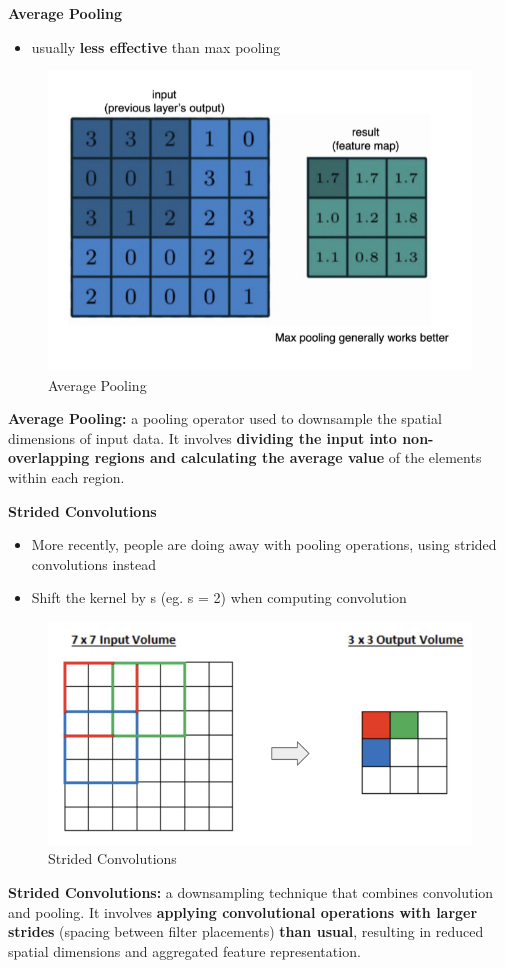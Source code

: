 \textbf{Average Pooling}
\begin{itemize}
    \item usually \textbf{less effective} than max pooling
\end{itemize}
\begin{figure}[h!t]
    \centering
    \includegraphics[width=0.4\linewidth]{averagepooling.png}
    \caption{Average Pooling}
    \label{fig:enter-label}
\end{figure}
\begin{definition}
    \textbf{Average Pooling:}  a pooling operator used to downsample the spatial dimensions of input data. It involves \textbf{dividing the input into non-overlapping regions and calculating the average value} of the elements within each region. 
\end{definition}

\textbf{Strided Convolutions}
\begin{itemize}
    \item More recently, people are doing away with pooling operations, using strided convolutions instead
    \item Shift the kernel by s (eg. s = 2) when computing convolution
\end{itemize}
\begin{figure}[h!t]
    \centering
    \includegraphics[width=0.45\linewidth]{stridedconvolution.png}
    \caption{Strided Convolutions}
    \label{fig:enter-label}
\end{figure}

\begin{definition}
    \textbf{Strided Convolutions:} a downsampling technique that combines convolution and pooling. It involves \textbf{applying convolutional operations with larger strides} (spacing between filter placements) \textbf{than usual}, resulting in reduced spatial dimensions and aggregated feature representation. 
\end{definition}

